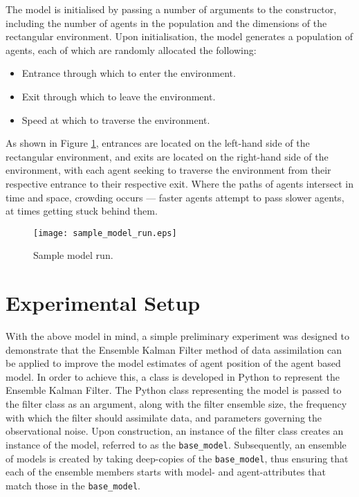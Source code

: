 The model is initialised by passing a number of arguments to the constructor,
including the number of agents in the population and the dimensions of the
rectangular environment.
Upon initialisation, the model generates a population of agents, each of which
are randomly allocated the following:
\begin{itemize}
    \item Entrance through which to enter the environment.
    \item Exit through which to leave the environment.
    \item Speed at which to traverse the environment.
\end{itemize}
As shown in Figure \ref{fig:sample_model_run}, entrances are located on the
left-hand side of the rectangular environment, and exits are located on the
right-hand side of the environment, with each agent seeking to traverse the
environment from their respective entrance to their respective exit.
Where the paths of agents intersect in time and space, crowding occurs ---
faster agents attempt to pass slower agents, at times getting stuck behind them.

\begin{figure}[h]
    \centering
    \texttt{[image: sample\_model\_run.eps]}
    \caption{Sample model run.}
    \label{fig:sample_model_run}
\end{figure}

\section{Experimental Setup}\label{sec:method:experiments}

With the above model in mind, a simple preliminary experiment was designed to
demonstrate that the Ensemble Kalman Filter method of data assimilation can be
applied to improve the model estimates of agent position of the agent based
model.
In order to achieve this, a class is developed in Python to represent the
Ensemble Kalman Filter.
The Python class representing the model is passed to the filter class as an
argument, along with the filter ensemble size, the frequency with which the
filter should assimilate data, and parameters governing the observational noise.
Upon construction, an instance of the filter class creates an instance of the
model, referred to as the \texttt{base\_model}.
Subsequently, an ensemble of models is created by taking deep-copies of the
\texttt{base\_model}, thus ensuring that each of the ensemble members starts
with model- and agent-attributes that match those in the \texttt{base\_model}.

